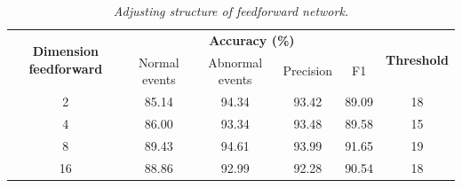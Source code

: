\begin{table}[H]
  \begin{center}
    \caption[Adjusting structure of feedforward network.]{\emph{Adjusting structure of feedforward network.}
      \hspace{\textwidth}}\label{tab:tran2t}
    \begin{tabular}{c c c c c c c}
      \hline
      \multicolumn{2}{c}{\multirow{2}{*}{\textbf{Dimension feedforward}}} & \multicolumn{4}{c}{\textbf{Accuracy (\%)}} & \multirow{2}{*}{\textbf{Threshold}}                                      \\
      \cline{3-6}
                                                                          &                                            & Normal events                       & Abnormal events & Precision & F1 & \\
      \hline
      \multicolumn{2}{c}{  2 }                                            & 85.14                                      & 94.34                               & 93.42           & 89.09     & 18   \\
      \multicolumn{2}{c}{  4 }                                            & 86.00                                      & 93.34                               & 93.48           & 89.58     & 15   \\
      \multicolumn{2}{c}{  8 }                                            & 89.43                                      & 94.61                               & 93.99           & 91.65     & 19   \\
      \multicolumn{2}{c}{ 16 }                                            & 88.86                                      & 92.99                               & 92.28           & 90.54     & 18   \\
      \hline
    \end{tabular}
  \end{center}
\end{table}


